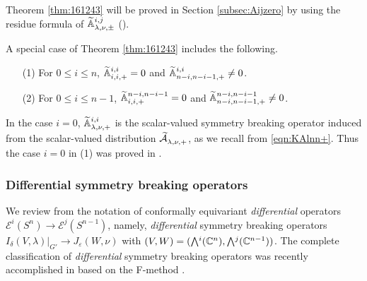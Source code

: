 Theorem \ref{thm:161243} will be proved in Section \ref{subsec:Aijzero}
 by using the residue formula
 of ${\widetilde{\mathbb{A}}}_{{\lambda},{\nu},{\pm}}^{{i,j}}$
 (\cite{xkresidue}).  



A special case of Theorem \ref{thm:161243} includes the following.  
\begin{example}
\label{ex:3.19}
\begin{enumerate}
\item[{\rm{(1)}}]
For $0 \leq i \leq n$, 
${\widetilde{\mathbb{A}}}_{{i},{i},{+}}^{{i,i}}=0$
 and 
${\widetilde{\mathbb{A}}}_{{n-i},{n-i-1},{+}}^{{i,i}} \ne 0$.  
\item[{\rm{(2)}}]
For $0 \leq i \leq n-1$, 
${\widetilde{\mathbb{A}}}_{{i},{i},{+}}^{{n-i,n-i-1}}  = 0$
 and ${\widetilde{\mathbb{A}}}_{{n-i},{n-i-1},{+}}^{{n-i,n-i-1}} \ne 0$. 
\end{enumerate}
\end{example}

\begin{remark}
In the case $i=0$, 
 ${\widetilde{\mathbb{A}}}_{{\lambda},{\nu},{+}}^{{i,i}}$
 is the scalar-valued
 symmetry breaking operator
 induced from the scalar-valued distribution 
 $\widetilde{{\mathcal{A}}}_{{\lambda},{\nu},{+}}^{{}}$, 
 as we recall from \eqref{eqn:KAlnn+}.  
Thus the case $i=0$ in (1)
 was proved in \cite[Thm.~8.1]{sbon}.  
\end{remark}




\subsubsection{Differential symmetry breaking operators}

We review from \cite{KKP} the notation
 of conformally equivariant {\it{differential}} operators
 ${\mathcal{E}}^i(S^n) \to {\mathcal{E}}^j(S^{n-1})$, 
 namely,
 {\it{differential}} symmetry breaking operators 
 $I_{\delta}(V,\lambda)|_{G'} \to J_{\varepsilon}(W,\nu)$
 with $(V,W)=(\Exterior^i({\mathbb{C}}^n), \Exterior^j({\mathbb{C}}^{n-1}))$.  
The complete classification of {\it{differential}} symmetry breaking operators
 was recently accomplished in \cite[Thm.~2.8]{KKP}
 based on the F-method
 \cite{xkHelg85}.  

